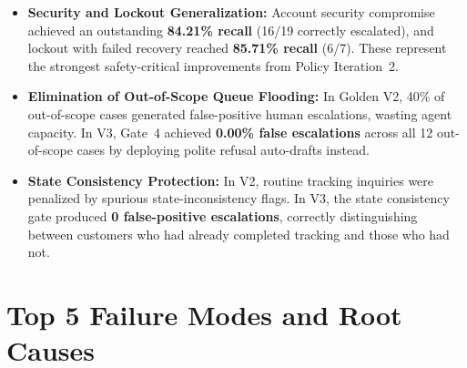 \documentclass[10pt,twocolumn,a4paper]{article}
\newcommand{\good}[1]{\textbf{\textcolor{accentgreen}{#1}}}
\begin{document}
\begin{itemize}
  \item \textbf{Security and Lockout Generalization:} Account security
        compromise achieved an outstanding \good{84.21\% recall}
        (16/19 correctly escalated), and lockout with failed recovery
        reached \good{85.71\% recall} (6/7). These represent the
        strongest safety-critical improvements from Policy Iteration~2.

  \item \textbf{Elimination of Out-of-Scope Queue Flooding:} In Golden
        V2, 40\% of out-of-scope cases generated false-positive human
        escalations, wasting agent capacity. In V3, Gate~4 achieved
        \good{0.00\% false escalations} across all 12 out-of-scope
        cases by deploying polite refusal auto-drafts instead.

  \item \textbf{State Consistency Protection:} In V2, routine tracking
        inquiries were penalized by spurious state-inconsistency flags.
        In V3, the state consistency gate produced \good{0 false-positive
        escalations}, correctly distinguishing between customers who
        had already completed tracking and those who had not.
\end{itemize}

\section{Top 5 Failure Modes and Root Causes}\label{sec:failures}
\end{document}

